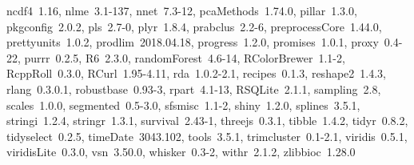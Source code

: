 \documentclass[12pt]{article}\usepackage[]{graphicx}\usepackage[]{color}
\begin{document}
\begin{appendices}
\begin{itemize}
    ncdf4~1.16, nlme~3.1-137, nnet~7.3-12, pcaMethods~1.74.0,
    pillar~1.3.0, pkgconfig~2.0.2, pls~2.7-0, plyr~1.8.4,
    prabclus~2.2-6, preprocessCore~1.44.0, prettyunits~1.0.2,
    prodlim~2018.04.18, progress~1.2.0, promises~1.0.1,
    proxy~0.4-22, purrr~0.2.5, R6~2.3.0, randomForest~4.6-14,
    RColorBrewer~1.1-2, RcppRoll~0.3.0, RCurl~1.95-4.11,
    rda~1.0.2-2.1, recipes~0.1.3, reshape2~1.4.3, rlang~0.3.0.1,
    robustbase~0.93-3, rpart~4.1-13, RSQLite~2.1.1, sampling~2.8,
    scales~1.0.0, segmented~0.5-3.0, sfsmisc~1.1-2, shiny~1.2.0,
    splines~3.5.1, stringi~1.2.4, stringr~1.3.1, survival~2.43-1,
    threejs~0.3.1, tibble~1.4.2, tidyr~0.8.2, tidyselect~0.2.5,
    timeDate~3043.102, tools~3.5.1, trimcluster~0.1-2.1,
    viridis~0.5.1, viridisLite~0.3.0, vsn~3.50.0, whisker~0.3-2,
    withr~2.1.2, zlibbioc~1.28.0
\end{itemize}


\end{appendices}



\end{document}
